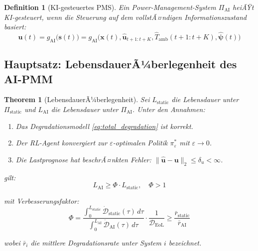 ﻿\documentclass[12pt,a4paper]{article}
\newtheorem{theorem}{Theorem}[section]
\newtheorem{definition}{Definition}[section]
\begin{document}
	\begin{definition}[KI-gesteuertes PMS]
		Ein Power-Management-System $\Pi_\mathrm{AI}$ heiÃŸt KI-gesteuert, wenn
		die Steuerung auf dem vollstÃ¤ndigen Informationszustand basiert:
		\begin{equation}
			\mathbf{u}(t) = g_\mathrm{AI}\bigl(\mathbf{s}(t)\bigr) = 
			g_\mathrm{AI}\bigl(\mathbf{x}(t), \hat{\mathbf{u}}_{t+1:t+K},
			\hat{T}_\mathrm{amb}(t+1:t+K), \hat{\boldsymbol{\psi}}(t)\bigr)
		\end{equation}
	\end{definition}
	
	\subsection{Hauptsatz: LebensdauerÃ¼berlegenheit des AI-PMM}
	
	\begin{theorem}[LebensdauerÃ¼berlegenheit]
		\label{thm:lifetime_superiority}
		Sei $L_\mathrm{static}$ die Lebensdauer unter $\Pi_\mathrm{static}$ und
		$L_\mathrm{AI}$ die Lebensdauer unter $\Pi_\mathrm{AI}$. Unter den Annahmen:
		
		\begin{enumerate}[label=(A\arabic*)]
			\item Das Degradationsmodell \eqref{eq:total_degradation} ist korrekt.
			\item Der RL-Agent konvergiert zur $\varepsilon$-optimalen Politik
			$\pi^*_\varepsilon$ mit $\varepsilon \to 0$.
			\item Die Lastprognose hat beschrÃ¤nkten Fehler:
			$\|\hat{\mathbf{u}} - \mathbf{u}\|_2 \leq \delta_u < \infty$.
		\end{enumerate}
		
		gilt:
		\begin{equation}
			L_\mathrm{AI} \geq \Phi \cdot L_\mathrm{static}, \quad \Phi > 1
			\label{eq:lifetime_theorem}
		\end{equation}
		
		mit Verbesserungsfaktor:
		\begin{equation}
			\Phi = \frac{\int_0^{L_\mathrm{static}} \dot{\mathcal{D}}_\mathrm{static}(\tau)\,d\tau}
			{\int_0^{L_\mathrm{AI}} \dot{\mathcal{D}}_\mathrm{AI}(\tau)\,d\tau}
			\cdot \frac{1}{\mathcal{D}_\mathrm{EoL}}
			\geq \frac{\bar{r}_\mathrm{static}}{\bar{r}_\mathrm{AI}}
			\label{eq:phi_factor}
		\end{equation}
		
		wobei $\bar{r}_i$ die mittlere Degradationsrate unter System $i$ bezeichnet.
	\end{theorem}
	
\end{document}
